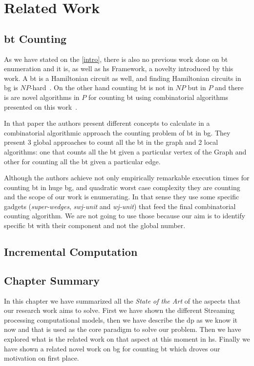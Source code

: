 \chapter{Related Work}\label{relate-work}

\section{\acrlong{bt} Counting}
As we have stated on the \autoref{intro}, there is also no previous work done on \acrshort{bt} enumeration and it is, as well as \acrshort{hs} Framework, a novelty introduced by this work.
A \acrshort{bt} is a Hamiltonian circuit as well, and finding Hamiltonian circuits in \acrshort{bg} is $NP$-hard~\cite{hamilbipartite-np}. On the other hand counting \acrshort{bt} is not in $NP$ 
but in $P$ and there is are novel algorithms in $P$ for counting \acrshort{bt} using combinatorial algorithms presented on this work~\cite{btcount}.

In that paper the authors present different concepts to calculate in a combinatorial algorithmic approach the counting problem of \acrshort{bt} in \acrshort{bg}. They present 3 global approaches to count
all the \acrshort{bt} in the graph and 2 local algorithms: one that counts all the \acrshort{bt} given a particular vertex of the Graph and other for counting all the \acrshort{bt} given a particular edge.

Although the authors achieve not only empirically remarkable execution times for counting \acrshort{bt} in huge \acrshort{bg}, and quadratic worst case complexity they are counting and the scope of our work
is enumerating. In that sense they use some specific gadgets (\emph{super-wedges}, \emph{swj-unit} and \emph{wj-unit}) that feed the final combinatorial counting algorithm. We are not going to use those because our 
aim is to identify specific \acrshort{bt} with their component and not the global number.

\section{Incremental Computation}

\section{Chapter Summary}
In this chapter we have summarized all the \emph{State of the Art} of the aspects that our research work aims to solve.
First we have shown the different Streaming processing computational models, then we have describe the \acrshort{dp} as we know it now and that is used 
as the core paradigm to solve our problem. Then we have explored what is the related work on that aspect at this moment in \acrshort{hs}. Finally we have shown 
a related novel work on \acrlong{bg} for counting \acrlong{bt} which droves our motivation on first place.
